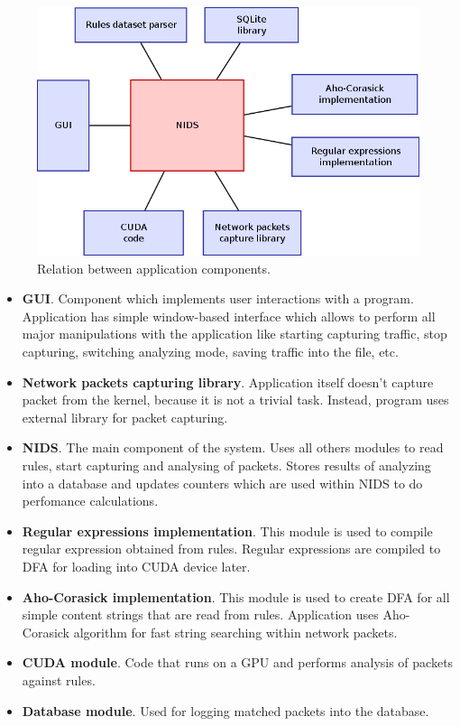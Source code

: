\documentclass[thesis=M,english]{FITthesis}[2011/07/15]
\begin{document}
\begin{figure}[h]
\centering
\includegraphics[scale=0.5]{images/app_architecture.png}
\caption{Relation between application components.}
\label{fig:app_architecture}
\end{figure}

\begin{itemize}
\item \textbf{GUI}. Component which implements user interactions with a program. Application has simple window-based interface which allows to perform all major manipulations with the application like starting capturing traffic, stop capturing, switching analyzing mode, saving traffic into the file, etc.
\item \textbf{Network packets capturing library}. Application itself doesn't capture packet from the kernel, because it is not a trivial task. Instead, program uses external library for packet capturing.
\item \textbf{NIDS}. The main component of the system. Uses all others modules to read rules, start capturing and analysing of packets. Stores results of analyzing into a database and updates counters which are used within NIDS to do perfomance calculations.
\item \textbf{Regular expressions implementation}. This module is used to compile regular expression obtained from rules. Regular expressions are compiled to DFA for loading into CUDA device later.
\item \textbf{Aho-Corasick implementation}. This module is used to create DFA for all simple content strings that are read from rules. Application uses Aho-Corasick algorithm for fast string searching within network packets.
\item \textbf{CUDA module}. Code that runs on a GPU and performs analysis of packets against rules.
\item \textbf{Database module}. Used for logging matched packets into the database.
\end{itemize}
\end{document}
